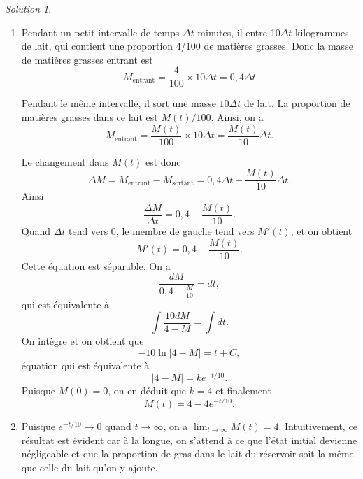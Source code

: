 \documentclass[
  12pt,
  letterpaper,
]{book}
\theoremstyle{remark}
\newtheorem*{solution}{Solution}
\begin{document}
\begin{solution}
\leavevmode

\begin{enumerate}
\item
  Pendant un petit intervalle de temps \(\Delta t\) minutes, il entre
  10\(\Delta t\) kilogrammes de lait, qui contient une proportion 4/100
  de matières grasses. Donc la masse de matières grasses entrant est
  \[M_{\text{entrant}} = \frac{4}{100} \times 10\Delta t = 0{,}4 \Delta t\]

  Pendant le même intervalle, il sort une masse \(10\Delta t\) de lait.
  La proportion de matières grasses dans ce lait est \(M(t)/100\).
  Ainsi, on a
  \[M_{\text{entrant}} = \frac{M(t)}{100} \times 10\Delta t = \frac{M(t)}{10} \Delta t.\]

  Le changement dans \(M(t)\) est donc
  \[\Delta M = M_{\text{entrant}} - M_{\text{sortant}} = 0{,}4 \Delta t - \frac{M(t)}{10} \Delta t.\]
  Ainsi \[\frac{\Delta M}{\Delta t} = 0{,}4 - \frac{M(t)}{10}.\] Quand
  \(\Delta t\) tend vers 0, le membre de gauche tend vers \(M'(t)\), et
  on obtient \[M'(t) = 0{,}4 - \frac{M(t)}{10}.\] Cette équation est
  séparable. On a \[\frac{dM}{0{,}4 - \frac{M}{10}} = dt,\] qui est
  équivalente à \[\int \frac{10dM}{4 - M} = \int dt.\] On intègre et on
  obtient que \[-10 \ln|4 - M| = t + C,\] équation qui est équivalente à
  \[|4 - M| = ke^{-t/10}.\] Puisque \(M(0) = 0\), on en déduit que
  \(k = 4\) et finalement \[M(t) = 4 - 4e^{-t/10}.\]
\item
  Puisque \(e^{-t/10} \to 0\) quand \(t \to \infty\), on a
  \(\lim_{t \to \infty} M(t) = 4\). Intuitivement, ce résultat est
  évident car à la longue, on s'attend à ce que l'état initial devienne
  négligeable et que la proportion de gras dans le lait du réservoir
  soit la même que celle du lait qu'on y ajoute.
\end{enumerate}

\end{solution}


\backmatter
\printbibliography
\end{document}
